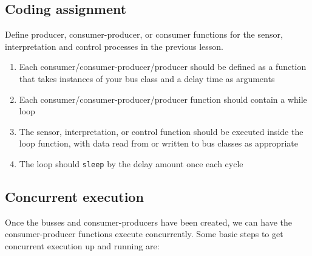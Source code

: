 \documentclass[11pt]{article}
\newcommand{\qurl}[1]{\begin{quote} \url{#1} \end{quote}}
\begin{document}
\subsection*{Coding assignment}
Define producer, consumer-producer, or consumer functions for the sensor, interpretation and control processes in the previous lesson.
\begin{enumerate}
\item Each consumer/consumer-producer/producer should be defined as a function that takes instances of your bus class and a delay time as arguments
\item Each consumer/consumer-producer/producer function should contain a while loop
\item The sensor, interpretation, or control function should be executed inside the loop function, with data read from or written to bus classes as appropriate
\item The loop should \verb#sleep# by the delay amount once each cycle
\end{enumerate}

\subsection{Concurrent execution} \label{sec:concurrent_execution}

Once the busses and consumer-producers have been created, we can have the consumer-producer functions execute concurrently. Some basic steps to get concurrent execution up and running are:


\end{document}
